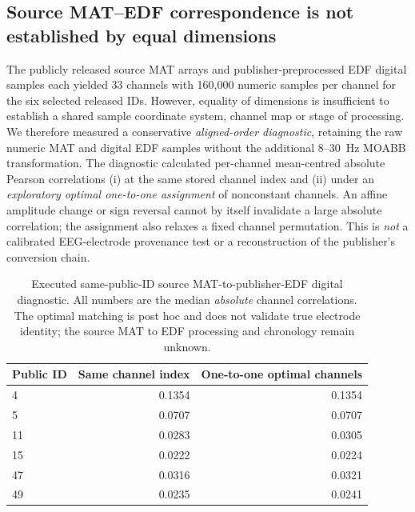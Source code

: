 \subsection{Source MAT--EDF correspondence is not established by equal dimensions}
\label{sec:p2-mat-edf-alignment}
The publicly released source MAT arrays and
publisher-preprocessed EDF digital samples each
yielded 33 channels with 160,000 numeric samples
per channel for the six selected released IDs.
However, equality of dimensions is insufficient
to establish a shared sample coordinate system,
channel map or stage of processing. We therefore
measured a conservative \emph{aligned-order
diagnostic}, retaining the raw numeric
MAT and digital EDF samples without the
additional 8--30~Hz MOABB transformation.
The diagnostic calculated per-channel
mean-centred absolute Pearson correlations
(i) at the same stored channel index and
(ii) under an \emph{exploratory optimal
one-to-one assignment} of nonconstant
channels. An affine amplitude
change or sign reversal cannot by itself
invalidate a large absolute correlation;
the assignment also relaxes a
fixed channel permutation.
This is \emph{not} a calibrated
EEG-electrode provenance test or a
reconstruction of the publisher's
conversion chain.

\begin{table}[tb]
\centering\small
\caption{Executed same-public-ID source
MAT-to-publisher-EDF digital diagnostic.
All numbers are the median \emph{absolute}
channel correlations. The optimal matching
is post hoc and does not validate true
electrode identity; the source MAT to EDF
processing and chronology remain unknown.}
\label{tab:p2-mat-edf-alignment}
\setlength{\tabcolsep}{5pt}
\begin{tabular}{lrr}
\toprule
Public ID & Same channel index & One-to-one optimal channels\\
\midrule
4  & 0.1354 & 0.1354\\
5  & 0.0707 & 0.0707\\
11 & 0.0283 & 0.0305\\
15 & 0.0222 & 0.0224\\
47 & 0.0316 & 0.0321\\
49 & 0.0235 & 0.0241\\
\bottomrule
\end{tabular}
\end{table}

